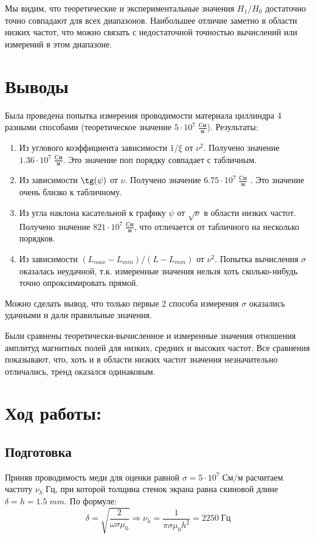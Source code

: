\documentclass[11pt]{article}
\begin{document}
Мы видим, что теоретические и экспериментальные значения \(H_1/H_0\) достаточно точно совпадают для всех диапазонов.
Наибольшее отличие заметно в области низких частот, что можно связать с недостаточной точностью вычислений или измерений в этом
диапазоне.


\section{Выводы}
Была проведена попытка измерения проводимости материала циллиндра 4 разными способами (теоретическое значение \( 5\cdot10^7\; \frac{См}{м} \)). Результаты:
\begin{enumerate}
    \item Из углового коэффициента зависимости \(1/\xi\) от \(\nu^2\). Получено значение \(1.36\cdot10^7\;\frac{См}{м}\). Это значение поп порядку
    совпадает с табличным.
    \item Из зависимости \( \tg(\psi) \) от \( \nu \). Получено значение \( 6.75\cdot10^7\; \frac{См}{м} \) . Это значение очень близко к табличному.
    \item Из угла наклона касательной к графику \( \psi \) от \(\sqrt{\nu}\) в области низких частот. Получено значение \( 821\cdot10^7\; \frac{См}{м} \),
    что отличается от табличного на несколько порядков.
    \item Из зависимости \( (L_{max} - L_{min})/(L - L_{min}) \) от \(\nu^2\). Попытка вычисления \(\sigma\) оказалась неудачной, т.к. измеренные значения
    нельзя хоть сколько-нибудь точно опроксимировать прямой.
\end{enumerate}
Можно сделать вывод, что только первые 2 способа измерения \(\sigma\) оказались удачными и дали правильные значения.

Были сравнены теоретически-вычисленное и измеренные значения отношения амплитуд магнитных полей для низких, средних и высоких частот.
Все сравнения показывают, что, хоть и в области низких частот значения незначительно отличались, тренд оказался одинаковым.

\section{Ход работы:}


\subsection{Подготовка}
Приняв проводимость меди для оценки равной \( \sigma = 5\cdot 10^{7}\; См/м \) расчитаем частоту \( \nu_h\; Гц \),
при которой толщина стенок экрана равна скиновой длине \( \delta = h = 1.5\; mm \). По формуле:
\[ \delta = \sqrt{\frac{2}{\omega \sigma \mu_0}} \Rightarrow \nu_h = \frac{1}{\pi\sigma\mu_0 h^2} = 2250\; Гц \]
\end{document}
